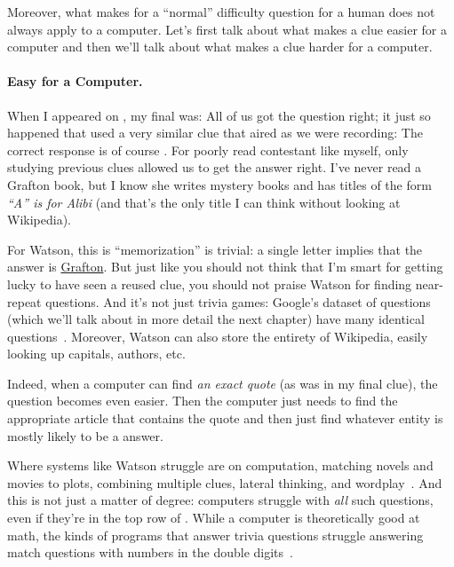 Moreover, what makes for a ``normal'' difficulty question for a human
does not always apply to a computer.
%
Let's first talk about what makes a clue easier for a computer and
then we'll talk about what makes a clue harder for a computer.

\paragraph{Easy for a Computer.}

When I appeared on \jeopardyp{}, my final \jeopardy{} was:
%
All of us got the question right; it just so happened that \jeopardy{}
used a very similar clue that aired as we were recording:
%
%
The correct response is of course .
%
For poorly read contestant like myself, only studying previous clues
allowed us to get the answer right.
%
I've never read a Grafton book, but I know she writes mystery books and
has titles of the form \textit{``A'' is for Alibi} (and that's the
only title I can think without looking at Wikipedia).

For Watson, this is ``memorization'' is trivial: a single letter
implies that the answer is \underline{Grafton}.
%
But just like you should not think that I'm smart for getting lucky to
have seen a reused clue, you should not praise Watson for finding
near-repeat questions.
%
And it's not just trivia games: Google's dataset of questions (which
we'll talk about in more detail the next chapter) have
many identical questions~\citep{lewis-21}.
%
Moreover, Watson can also store the entirety of Wikipedia, easily
looking up capitals, authors, etc.

Indeed, when a computer can find \emph{an exact quote} (as was in my
final \jeopardy{} clue), the question becomes even easier.
%
Then the computer just needs to find the appropriate article that
contains the quote and then just find whatever entity is mostly likely
to be a \jeopardyp{} answer.

Where systems like Watson struggle are on computation, matching novels
and movies to plots, combining multiple clues, lateral thinking, and
wordplay~\citep{kaushik-18}.
%
And this is not just a matter of degree: computers struggle with \emph{all}
such questions, even if they're in the top row of \jeopardyp{}.
%
While a computer is theoretically good at math, the kinds of programs
that answer trivia questions struggle answering match questions with
numbers in the double digits~\citep{wallace-19:numbers}.

